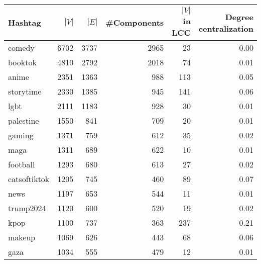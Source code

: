 \begin{tabular}{lrrrrr}
\toprule
         Hashtag &  $|V|$ &  $|E|$  &  \#Components &  \makecell{$|V|$\\ in LCC} &  \makecell{Degree\\ centralization} \\
\midrule
          comedy &   6702 &   3737 &          2965 &                         23 &                                0.00 \\
         booktok &   4810 &   2792 &          2018 &                         74 &                                0.01 \\
           anime &   2351 &   1363 &           988 &                        113 &                                0.05 \\
       storytime &   2330 &   1385 &           945 &                        141 &                                0.06 \\
            lgbt &   2111 &   1183 &           928 &                         30 &                                0.01 \\
       palestine &   1550 &    841 &           709 &                         20 &                                0.01 \\
          gaming &   1371 &    759 &           612 &                         35 &                                0.02 \\
            maga &   1311 &    689 &           622 &                         10 &                                0.01 \\
        football &   1293 &    680 &           613 &                         27 &                                0.02 \\
    catsoftiktok &   1205 &    745 &           460 &                         89 &                                0.07 \\
            news &   1197 &    653 &           544 &                         11 &                                0.01 \\
       trump2024 &   1120 &    600 &           520 &                         19 &                                0.02 \\
            kpop &   1100 &    737 &           363 &                        237 &                                0.21 \\
          makeup &   1069 &    626 &           443 &                         68 &                                0.06 \\
            gaza &   1034 &    555 &           479 &                         12 &                                0.01 \\

\end{tabular}
